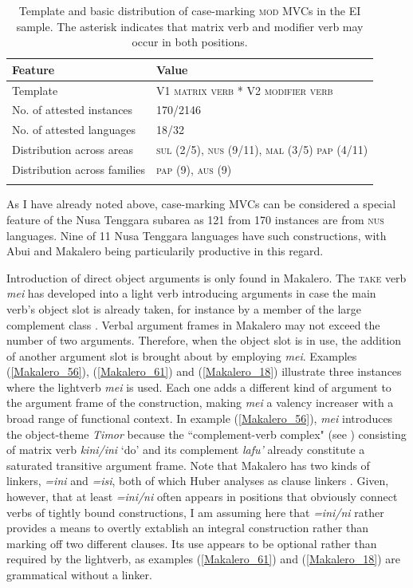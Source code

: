 \begin{table}
\begin{tabular}{ll}
\lsptoprule
Feature&Value\tabularnewline
\hline
Template&V1 \textsc{matrix verb} * V2 \textsc{modifier verb}\tabularnewline
No. of attested instances& 170/2146 \tabularnewline
No. of attested languages& 18/32 \tabularnewline
Distribution across areas& \textsc{sul} (2/5), \textsc{nus} (9/11), \textsc{mal} (3/5) \textsc{pap} (4/11) \tabularnewline
Distribution across families& \textsc{pap} (9), \textsc{aus} (9) \tabularnewline
\lspbottomrule
\end{tabular}
\caption[Template and basic distribution of case-marking \textsc{mod} MVCs]{Template and basic distribution of case-marking \textsc{mod} MVCs in the EI sample. The asterisk indicates that matrix verb and modifier verb may occur in both positions.}
\label{table:case}
\end{table}

As I have already noted above, case-marking MVCs can be considered a special feature of the Nusa Tenggara subarea as 121 from 170 instances are from \textsc{nus} languages. Nine of 11 Nusa Tenggara languages have such constructions, with Abui and Makalero being particularily productive in this regard.

Introduction of direct object arguments is only found in Makalero. The \textsc{take} verb \textit{mei} has developed into a light verb introducing arguments in case the main verb's object slot is already taken, for instance by a member of the large complement class \citep[203f.]{huber2011}. Verbal argument frames in Makalero may not exceed the number of two arguments. Therefore, when the object slot is in use, the addition of another argument slot is brought about by employing \textit{mei}. Examples (\ref{Makalero_56}), (\ref{Makalero_61}) and (\ref{Makalero_18}) illustrate three instances where the lightverb \textit{mei} is used. Each one adds a different kind of argument to the argument frame of the construction, making \textit{mei} a valency increaser with a broad range of functional context. In example (\ref{Makalero_56}), \textit{mei} introduces the object-theme \textit{Timor} because the ``complement-verb complex" (see \citealt[131f.]{huber2011}) consisting of matrix verb \textit{kini/ini} `do' and its complement \textit{lafu'} already constitute a saturated transitive argument frame. Note that Makalero has two kinds of linkers, \textit{=ini} and \textit{=isi}, both of which Huber analyses as clause linkers \citep[457f.]{huber2011}. Given, however, that at least \textit{=ini/ni} often appears in positions that obviously connect verbs of tightly bound constructions, I am assuming here that \textit{=ini/ni} rather provides a means to overtly extablish an integral construction rather than marking off two different clauses. Its use appears to be optional rather than required by the lightverb, as examples (\ref{Makalero_61}) and (\ref{Makalero_18}) are grammatical without a linker.

